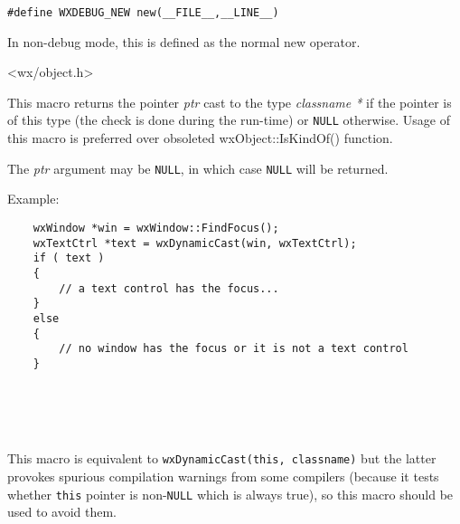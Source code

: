 \begin{verbatim}
#define WXDEBUG_NEW new(__FILE__,__LINE__)
\end{verbatim}

In non-debug mode, this is defined as the normal new operator.


<wx/object.h>


\label{wxdynamiccast}


This macro returns the pointer {\it ptr} cast to the type {\it classname *} if
the pointer is of this type (the check is done during the run-time) or
{\tt NULL} otherwise. Usage of this macro is preferred over obsoleted
wxObject::IsKindOf() function.

The {\it ptr} argument may be {\tt NULL}, in which case {\tt NULL} will be
returned.

Example:

\begin{verbatim}
    wxWindow *win = wxWindow::FindFocus();
    wxTextCtrl *text = wxDynamicCast(win, wxTextCtrl);
    if ( text )
    {
        // a text control has the focus...
    }
    else
    {
        // no window has the focus or it is not a text control
    }
\end{verbatim}


\\
\\
\\


\label{wxdynamiccastthis}


This macro is equivalent to {\tt wxDynamicCast(this, classname)} but the
latter provokes spurious compilation warnings from some compilers (because it
tests whether {\tt this} pointer is non-{\tt NULL} which is always true), so
this macro should be used to avoid them.




\label{wxstaticcast}

